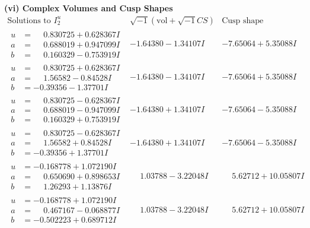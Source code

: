 \documentclass[1p]{elsarticle_modified}
\theoremstyle{definition}
\newcommand{\I}{\sqrt{-1}}
\begin{document}
\newpage\flushleft \textbf{(vi) Complex Volumes and Cusp Shapes}
$$\begin{array}{c|c|c}  
\text{Solutions to }I^u_{2}& \I (\text{vol} + \sqrt{-1}CS) & \text{Cusp shape}\\
 \hline 
\begin{aligned}
u &= \phantom{-}0.830725 + 0.628367 I \\
a &= \phantom{-}0.688019 + 0.947099 I \\
b &= \phantom{-}0.160329 - 0.753919 I\end{aligned}
 & -1.64380 - 1.34107 I & -7.65064 + 5.35088 I \\ \hline\begin{aligned}
u &= \phantom{-}0.830725 + 0.628367 I \\
a &= \phantom{-}1.56582 - 0.84528 I \\
b &= -0.39356 - 1.37701 I\end{aligned}
 & -1.64380 - 1.34107 I & -7.65064 + 5.35088 I \\ \hline\begin{aligned}
u &= \phantom{-}0.830725 - 0.628367 I \\
a &= \phantom{-}0.688019 - 0.947099 I \\
b &= \phantom{-}0.160329 + 0.753919 I\end{aligned}
 & -1.64380 + 1.34107 I & -7.65064 - 5.35088 I \\ \hline\begin{aligned}
u &= \phantom{-}0.830725 - 0.628367 I \\
a &= \phantom{-}1.56582 + 0.84528 I \\
b &= -0.39356 + 1.37701 I\end{aligned}
 & -1.64380 + 1.34107 I & -7.65064 - 5.35088 I \\ \hline\begin{aligned}
u &= -0.168778 + 1.072190 I \\
a &= \phantom{-}0.650690 + 0.898653 I \\
b &= \phantom{-}1.26293 + 1.13876 I\end{aligned}
 & \phantom{-}1.03788 - 3.22048 I & \phantom{-}5.62712 + 10.05807 I \\ \hline\begin{aligned}
u &= -0.168778 + 1.072190 I \\
a &= \phantom{-}0.467167 - 0.068877 I \\
b &= -0.502223 + 0.689712 I\end{aligned}
 & \phantom{-}1.03788 - 3.22048 I & \phantom{-}5.62712 + 10.05807 I \\ \hline\begin{aligned}

\end{aligned}
\end{array}$$
\end{document}
